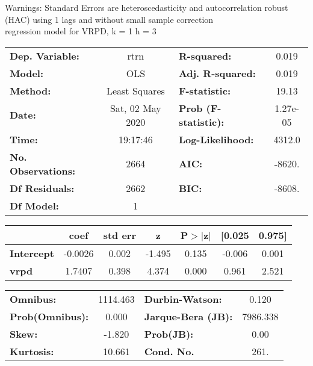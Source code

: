 Warnings: \newline
 [1] Standard Errors are heteroscedasticity and autocorrelation robust (HAC) using 1 lags and without small sample correction\\ 

regression model for VRPD, k = 1 h = 3\begin{center}
\begin{tabular}{lclc}
\toprule
\textbf{Dep. Variable:}    &       rtrn       & \textbf{  R-squared:         } &     0.019   \\
\textbf{Model:}            &       OLS        & \textbf{  Adj. R-squared:    } &     0.019   \\
\textbf{Method:}           &  Least Squares   & \textbf{  F-statistic:       } &     19.13   \\
\textbf{Date:}             & Sat, 02 May 2020 & \textbf{  Prob (F-statistic):} &  1.27e-05   \\
\textbf{Time:}             &     19:17:46     & \textbf{  Log-Likelihood:    } &    4312.0   \\
\textbf{No. Observations:} &        2664      & \textbf{  AIC:               } &    -8620.   \\
\textbf{Df Residuals:}     &        2662      & \textbf{  BIC:               } &    -8608.   \\
\textbf{Df Model:}         &           1      & \textbf{                     } &             \\
\bottomrule
\end{tabular}
\begin{tabular}{lcccccc}
                   & \textbf{coef} & \textbf{std err} & \textbf{z} & \textbf{P$> |$z$|$} & \textbf{[0.025} & \textbf{0.975]}  \\
\midrule
\textbf{Intercept} &      -0.0026  &        0.002     &    -1.495  &         0.135        &       -0.006    &        0.001     \\
\textbf{vrpd}      &       1.7407  &        0.398     &     4.374  &         0.000        &        0.961    &        2.521     \\
\bottomrule
\end{tabular}
\begin{tabular}{lclc}
\textbf{Omnibus:}       & 1114.463 & \textbf{  Durbin-Watson:     } &    0.120  \\
\textbf{Prob(Omnibus):} &   0.000  & \textbf{  Jarque-Bera (JB):  } & 7986.338  \\
\textbf{Skew:}          &  -1.820  & \textbf{  Prob(JB):          } &     0.00  \\
\textbf{Kurtosis:}      &  10.661  & \textbf{  Cond. No.          } &     261.  \\
\bottomrule
\end{tabular}
\end{center}

